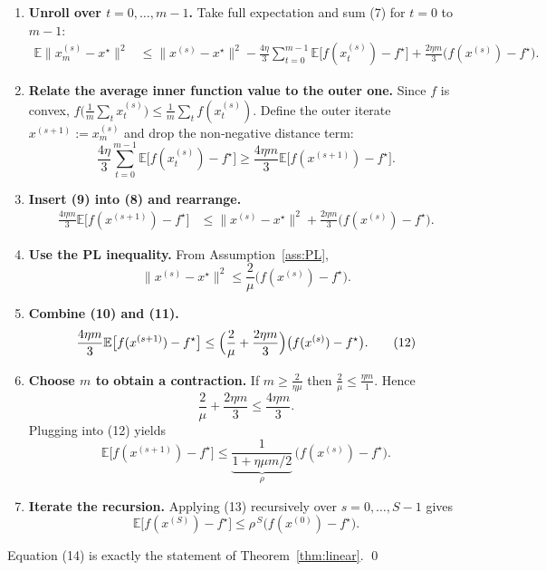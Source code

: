 \documentclass{article}
\newcommand{\E}{\mathbb{E}}
\begin{document}
\begin{enumerate}[label=[Step \arabic*]]
\item \textbf{Unroll over $t=0,\dots,m-1$.}  
Take full expectation and sum (7) for $t=0$ to $m-1$:
\[
\begin{aligned}
\E\|x_{m}^{(s)}-x^\star\|^2
&\le \|x^{(s)}-x^\star\|^2
   -\frac{4\eta}{3}\sum_{t=0}^{m-1}\E\bigl[f(x_t^{(s)})-f^\star\bigr]
   +\frac{2\eta m}{3}\bigl(f(x^{(s)})-f^\star\bigr) .
\end{aligned}
\tag{8}
\]

\item \textbf{Relate the average inner function value to the outer one.}  
Since $f$ is convex, $f\bigl(\frac1m\sum_{t}x_t^{(s)}\bigr)\le \frac1m\sum_t f(x_t^{(s)})$.  
Define the outer iterate $x^{(s+1)}:=x_m^{(s)}$ and drop the non‑negative distance term:
\[
\frac{4\eta}{3}\sum_{t=0}^{m-1}\E\bigl[f(x_t^{(s)})-f^\star\bigr]
\ge \frac{4\eta m}{3}\E\bigl[f(x^{(s+1)})-f^\star\bigr].
\tag{9}
\]

\item \textbf{Insert (9) into (8) and rearrange.}
\[
\begin{aligned}
\frac{4\eta m}{3}\E\bigl[f(x^{(s+1)})-f^\star\bigr]
&\le \|x^{(s)}-x^\star\|^2
   +\frac{2\eta m}{3}\bigl(f(x^{(s)})-f^\star\bigr) .
\end{aligned}
\tag{10}
\]

\item \textbf{Use the PL inequality.}  
From Assumption~\ref{ass:PL},
\[
\|x^{(s)}-x^\star\|^2\le \frac{2}{\mu}\bigl(f(x^{(s)})-f^\star\bigr) .
\tag{11}
\]

\item \textbf{Combine (10) and (11).}
\[
\frac{4\eta m}{3}\E\bigl[f(x^{(s+1)})-f^\star\bigr]
\le \Bigl(\frac{2}{\mu}+\frac{2\eta m}{3}\Bigr)\bigl(f(x^{(s)})-f^\star\bigr) .
\tag{12}
\]

\item \textbf{Choose $m$ to obtain a contraction.}  
If $m\ge \frac{2}{\eta\mu}$ then $\frac{2}{\mu}\le \frac{\eta m}{1}$. Hence
\[
\frac{2}{\mu}+\frac{2\eta m}{3}\le \frac{4\eta m}{3}.
\]
Plugging into (12) yields
\[
\E\bigl[f(x^{(s+1)})-f^\star\bigr]
\le \underbrace{\frac{1}{1+\eta\mu m/2}}_{\displaystyle \rho}\,\bigl(f(x^{(s)})-f^\star\bigr) .
\tag{13}
\]

\item \textbf{Iterate the recursion.}  
Applying (13) recursively over $s=0,\dots,S-1$ gives
\[
\E\bigl[f(x^{(S)})-f^\star\bigr]\le \rho^{\,S}\bigl(f(x^{(0)})-f^\star\bigr) .
\tag{14}
\]

\end{enumerate}
Equation (14) is exactly the statement of Theorem~\ref{thm:linear}. \qed
\end{document}
